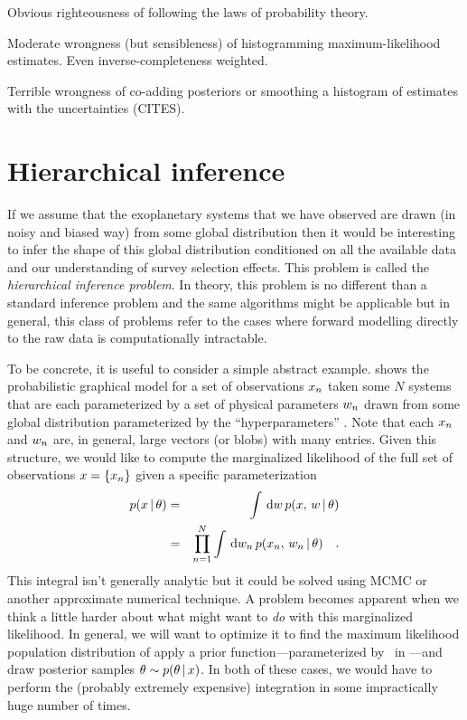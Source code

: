 \documentclass[12pt,preprint]{aastex}
\begin{document}
Obvious righteousness of following the laws of probability theory.

Moderate wrongness (but sensibleness) of histogramming maximum-likelihood estimates.
Even inverse-completeness weighted.

Terrible wrongness of co-adding posteriors or smoothing a histogram of estimates with the uncertainties (CITES).

\section{Hierarchical inference}

If we assume that the exoplanetary systems that we have observed are drawn (in
noisy and biased way) from some global distribution then it would be
interesting to infer the shape of this global distribution conditioned on all
the available data and our understanding of survey selection effects.
This problem is called the \emph{hierarchical inference problem}.
In theory, this problem is no different than a standard inference problem and
the same algorithms might be applicable but in general, this class of problems
refer to the cases where forward modelling directly to the raw data is
computationally intractable.

To be concrete, it is useful to consider a simple abstract example.
 shows the probabilistic graphical model for a set of
observations $x_n$ taken some $N$ systems that are each parameterized by a
set of physical parameters $w_n$ drawn from some global distribution
parameterized by the ``hyperparameters'' \hyper.
Note that each $x_n$ and $w_n$ are, in general, large vectors (or
blobs) with many entries.
Given this structure, we would like to compute the marginalized likelihood of
the full set of observations $x = \{ x_n \}$ given a specific
parameterization \hyper
\begin{eqnarray}
p(\data\,|\,\hyper) &=& \int \dd \local\,p(\data,\,\local\,|\,\hyper)
\nonumber\\
&=& \prod_{n=1}^N\int \dd \local_n\,p(\data_n,\,\local_n\,|\,\hyper) \quad.
\eqlabel{marg-like}
\end{eqnarray}
This integral isn't generally analytic but it could be solved using MCMC or
another approximate numerical technique.
A problem becomes apparent when we think a little harder about what might want
to \emph{do} with this marginalized likelihood.
In general, we will want to optimize it to find the maximum likelihood
population distribution of apply a prior function---parameterized by
\hyperhyper\ in ---and draw posterior samples
$\theta \sim p(\theta\,|\,x)$.
In both of these cases, we would have to perform the (probably extremely
expensive) integration in  some impractically huge number of
times.
\end{document}
